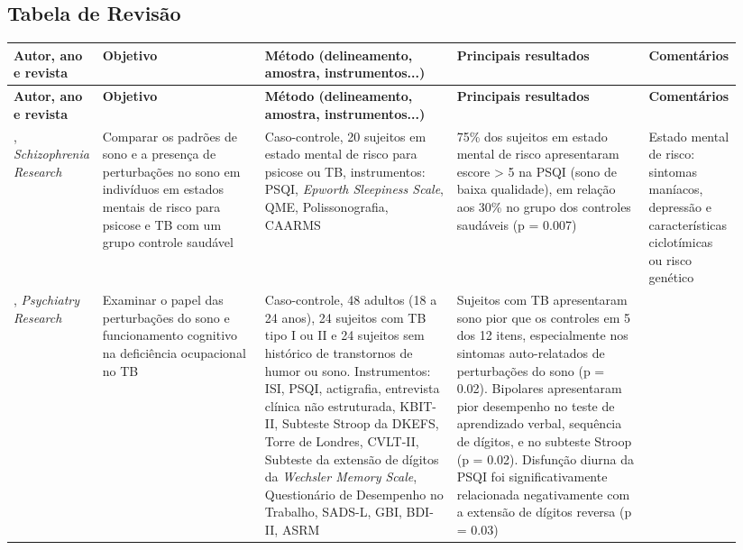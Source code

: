 \documentclass[chapter=TITLE,oneside,12pt,a4paper,english,brazil]{abntex2} %
\begin{document}
\begin{anexosenv}

    \begin{landscape}
    \chapter{Tabela de Revisão}
            \noindent
            \begin{longtabu} to 
\toprule
\textbf{Autor, ano e revista} & \textbf{Objetivo} & \textbf{Método (delineamento, amostra, instrumentos...)} & \textbf{Principais resultados} & \textbf{Comentários} \\ \midrule
\endfirsthead
%
\toprule
\textbf{Autor, ano e revista} & \textbf{Objetivo} & \textbf{Método (delineamento, amostra, instrumentos...)} & \textbf{Principais resultados} & \textbf{Comentários} \\ \midrule
\endhead
%
    \textcite{zanini_abnormalities_2015}, \textit{Schizophrenia Research} &
    Comparar os padrões de sono e a presença de perturbações no sono em indivíduos em estados mentais de risco para psicose e TB com um grupo controle saudável &
    Caso-controle, 20 sujeitos em estado mental de risco para psicose ou TB, instrumentos: PSQI, \textit{Epworth Sleepiness Scale}, QME, Polissonografia, CAARMS &
    75\% dos sujeitos em estado mental de risco apresentaram escore > 5 na PSQI (sono de baixa qualidade), em relação aos 30\% no grupo dos controles saudáveis (p = 0.007) &
Estado mental de risco: sintomas maníacos, depressão e características ciclotímicas ou risco genético \\ \midrule
    \textcite{boland_associations_2015}, \textit{Psychiatry Research} &
    Examinar o papel das perturbações do sono e funcionamento cognitivo na deficiência ocupacional no TB &
    Caso-controle, 48 adultos (18 a 24 anos), 24 sujeitos com TB tipo I ou II e 24 sujeitos sem histórico de transtornos de humor ou sono. Instrumentos: ISI, PSQI, actigrafia, entrevista clínica não estruturada, KBIT-II, Subteste Stroop da DKEFS, Torre de Londres, CVLT-II, Subteste da extensão de dígitos da \textit{Wechsler Memory Scale}, Questionário de Desempenho no Trabalho, SADS-L, GBI, BDI-II, ASRM &
    Sujeitos com TB apresentaram sono pior que os controles em 5 dos 12 itens, especialmente nos sintomas auto-relatados de perturbações do sono (p = 0.02). Bipolares apresentaram pior desempenho no teste de aprendizado verbal, sequência de dígitos, e no subteste Stroop (p = 0.02). Disfunção diurna da PSQI foi significativamente relacionada negativamente com a extensão de dígitos reversa (p = 0.03) &

\end{longtabu}
\end{landscape}
\end{anexosenv}
\end{document}
